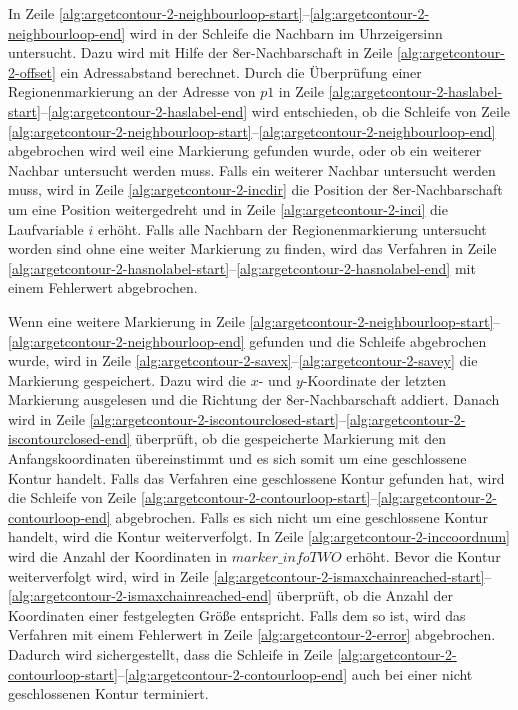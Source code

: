 In Zeile \ref{alg:argetcontour-2-neighbourloop-start}--\ref{alg:argetcontour-2-neighbourloop-end} wird in der Schleife
 die Nachbarn im Uhrzeigersinn untersucht. Dazu wird mit Hilfe der 8er-Nachbarschaft in Zeile
 \ref{alg:argetcontour-2-offset} ein Adressabstand berechnet. Durch die Überprüfung einer Regionenmarkierung an der
 Adresse von $\mathit{p1}$ in Zeile \ref{alg:argetcontour-2-haslabel-start}--\ref{alg:argetcontour-2-haslabel-end} wird
 entschieden, ob die Schleife von Zeile
 \ref{alg:argetcontour-2-neighbourloop-start}--\ref{alg:argetcontour-2-neighbourloop-end} abgebrochen wird weil eine
 Markierung gefunden wurde, oder ob ein weiterer Nachbar untersucht werden muss. Falls ein weiterer Nachbar untersucht
 werden muss, wird in Zeile \ref{alg:argetcontour-2-incdir} die Position der 8er-Nachbarschaft um eine Position
 weitergedreht und in Zeile \ref{alg:argetcontour-2-inci} die Laufvariable $i$ erhöht. Falls alle Nachbarn der
 Regionenmarkierung untersucht worden sind ohne eine weiter Markierung zu finden, wird das Verfahren in Zeile
 \ref{alg:argetcontour-2-hasnolabel-start}--\ref{alg:argetcontour-2-hasnolabel-end} mit einem Fehlerwert abgebrochen.

Wenn eine weitere Markierung in Zeile
 \ref{alg:argetcontour-2-neighbourloop-start}--\ref{alg:argetcontour-2-neighbourloop-end} gefunden und die Schleife
 abgebrochen wurde, wird in Zeile \ref{alg:argetcontour-2-savex}--\ref{alg:argetcontour-2-savey} die Markierung
 gespeichert. Dazu wird die $x$- und $y$-Koordinate der letzten Markierung ausgelesen und die Richtung der
 8er-Nachbarschaft addiert. Danach wird in Zeile
 \ref{alg:argetcontour-2-iscontourclosed-start}--\ref{alg:argetcontour-2-iscontourclosed-end} überprüft, ob die
 gespeicherte Markierung mit den Anfangskoordinaten übereinstimmt und es sich somit um eine geschlossene Kontur
 handelt. Falls das Verfahren eine geschlossene Kontur gefunden hat, wird die Schleife von Zeile
 \ref{alg:argetcontour-2-contourloop-start}--\ref{alg:argetcontour-2-contourloop-end} abgebrochen. Falls es sich nicht
 um eine geschlossene Kontur handelt, wird die Kontur weiterverfolgt. In Zeile \ref{alg:argetcontour-2-inccoordnum}
 wird die Anzahl der Koordinaten in $\mathit{marker\_infoTWO}$ erhöht. Bevor die Kontur weiterverfolgt wird, wird in
 Zeile \ref{alg:argetcontour-2-ismaxchainreached-start}--\ref{alg:argetcontour-2-ismaxchainreached-end} überprüft, ob
 die Anzahl der Koordinaten einer festgelegten Größe entspricht. Falls dem so ist, wird das Verfahren mit einem
 Fehlerwert in Zeile \ref{alg:argetcontour-2-error} abgebrochen. Dadurch wird sichergestellt, dass die Schleife in
 Zeile \ref{alg:argetcontour-2-contourloop-start}--\ref{alg:argetcontour-2-contourloop-end} auch bei einer nicht
 geschlossenen Kontur terminiert.

